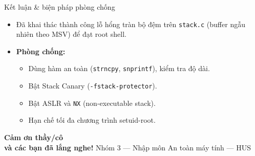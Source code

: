 \documentclass[aspectratio=169,10pt]{beamer}
\begin{document}
\begin{frame}{Kết luận \& biện pháp phòng chống}
  \begin{itemize}
    \item Đã khai thác thành công lỗ hổng tràn bộ đệm trên \texttt{stack.c}
          (buffer ngẫu nhiên theo MSV) để đạt root shell.
    \item \textbf{Phòng chống:}
      \begin{itemize}
        \item Dùng hàm an toàn (\texttt{strncpy}, \texttt{snprintf}), kiểm tra độ dài.
        \item Bật Stack Canary (\texttt{-fstack-protector}).
        \item Bật ASLR và \texttt{NX} (non-executable stack).
        \item Hạn chế tối đa chương trình setuid-root.
      \end{itemize}
  \end{itemize}
\end{frame}

\begin{frame}[plain]
  \centering
  \vfill
  {\Huge \textbf{Cảm ơn thầy/cô \\ và các bạn đã lắng nghe!}}
  \vfill
  \footnotesize Nhóm 3 --- Nhập môn An toàn máy tính --- HUS
  \vfill
\end{frame}
\end{document}
